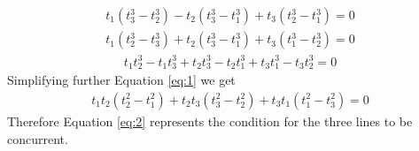\documentclass[journal,12pt,twocolumn]{IEEEtran}
\begin{document}
\begin{align}
t_1(t_3^3-t_2^3)-t_2(t_3^3-t_1^3)+t_3(t_2^3-t_1^3)=0\\
t_1(t_2^3-t_3^3)+t_2(t_3^3-t_1^3)+t_3(t_1^3-t_2^3)=0
\end{align}
\begin{equation}
\begin{split}
t_1t_2^3-t_1t_3^3+t_2t_3^3-t_2t_1^3+t_3t_1^3-t_3t_2^3=0
\end{split}
\label{eq:1}
\end{equation}
Simplifying further Equation \eqref{eq:1} we get 
\begin{equation}
\begin{split}
t_1t_2(t_2^2-t_1^2)+t_2t_3(t_3^2-t_2^2)+t_3t_1(t_1^2-t_3^2)=0
\label{eq:2}
\end{split}
\end{equation}
Therefore Equation \eqref{eq:2} represents the condition for the three lines to be concurrent.
\end{document}
